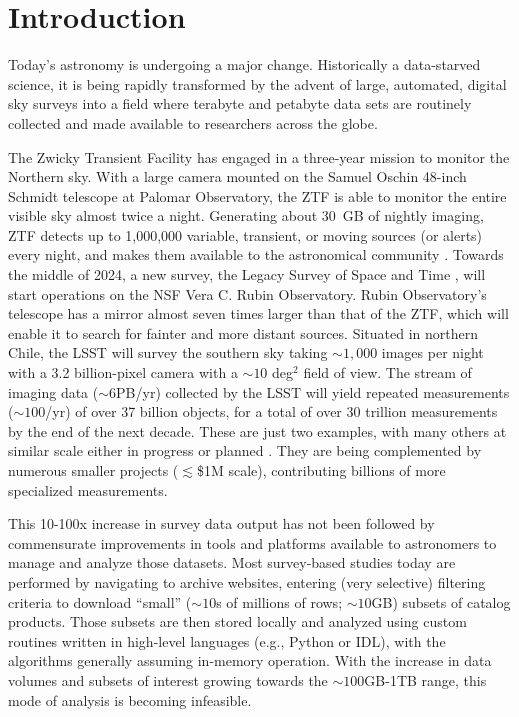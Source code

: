 \documentclass[twocolumn, linenumbers]{aastex631}
\begin{document}

\section{Introduction} \label{sec:intro}

Today's astronomy is undergoing a major change. Historically a data-starved science, it is being rapidly transformed by the advent of large, automated, digital sky surveys into a field where terabyte and petabyte data sets are routinely collected and made available to researchers across the globe.

The Zwicky Transient Facility \citep[ZTF;][]{2019PASP..131a8002B, 2019PASP..131g8001G, 2020PASP..132c8001D, 2019PASP..131a8003M} has engaged in a three-year mission to monitor the Northern sky. With a large camera mounted on the Samuel Oschin 48-inch Schmidt telescope at Palomar Observatory, the ZTF is able to monitor the entire visible sky almost twice a night. Generating about 30~GB of nightly imaging, ZTF detects up to 1,000,000 variable, transient, or moving sources (or alerts) every night, and makes them available to the astronomical community \citep{Patterson_2018}. Towards the middle of 2024, a new survey, the Legacy Survey of Space and Time  \citep[LSST;][]{lsstOverview}, will start operations on the NSF Vera C. Rubin Observatory. Rubin Observatory's telescope has a mirror almost seven times larger than that of the ZTF, which will enable it to search for fainter and more distant sources. Situated in northern Chile, the LSST will survey the southern sky taking ${\sim}1,000$ images per night with a 3.2 billion-pixel camera with a ${\sim}10$ deg$^2$ field of view. The stream of imaging data (${\sim}6$PB/yr) collected by the LSST will yield repeated measurements (${\sim}100$/yr) of over 37 billion objects, for a total of over 30 trillion measurements by the end of the next decade. These are just two examples, with many others at similar scale either in progress \citep[Kepler, Pan-STARRS, DES, GAIA, ATLAS, ASAS-SN;][]{2010SPIE.7733E..0EK, 2016MNRAS.460.1270D, 2016A&A...595A...1G,2018PASP..130f4505T,2014AAS...22323603S} or planned \citep[WFIRST, Euclid;][]{2015arXiv150303757S,2014IAUS..306..375S}. They are being complemented by numerous smaller projects ($\lesssim$\$1M scale), contributing billions of more specialized measurements.

This 10-100x increase in survey data output has not been followed by commensurate improvements in tools and platforms available to astronomers to manage and analyze those datasets. Most survey-based studies today are performed by navigating to archive websites, entering (very selective) filtering criteria to download ``small'' (${\sim}10$s of millions of rows; ${\sim}10$GB) subsets of catalog products. Those subsets are then stored locally and analyzed using custom routines written in high-level languages (e.g., Python or IDL), with the algorithms generally assuming in-memory operation. With the increase in data volumes and subsets of interest growing towards the ${\sim}100$GB-1TB range, this mode of analysis is becoming infeasible.
\end{document}
